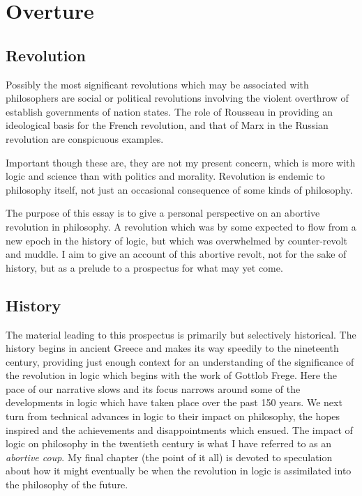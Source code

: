 \chapter{Overture}\label{Overture}

\section{Revolution}

Possibly the most significant revolutions which may be associated with philosophers are social or political revolutions involving the violent overthrow of establish governments of nation states.
The role of Rousseau in providing an ideological basis for the French revolution, and that of Marx in the Russian revolution are conspicuous examples.

Important though these are, they are not my present concern, which is more with logic and science than with politics and morality.
Revolution is endemic to philosophy itself, not just an occasional consequence of some kinds of philosophy.

The purpose of this essay is to give a personal perspective on an abortive revolution in philosophy.
A revolution which was by some expected to flow from a new epoch in the history of logic, but which was overwhelmed by counter-revolt and muddle.
I aim to give an account of this abortive revolt, not for the sake of history, but as a prelude to a prospectus for what may yet come.

\section{History}

The material leading to this prospectus is primarily but selectively historical.
The history begins in ancient Greece and makes its way speedily to the nineteenth century, providing just enough context for an understanding of the significance of the revolution in logic which begins with the work of Gottlob Frege.
Here the pace of our narrative slows and its focus narrows around some of the developments in logic which have taken place over the past 150 years.
We next turn from technical advances in logic to their impact on philosophy, the hopes inspired and the achievements and disappointments which ensued.
The impact of logic on philosophy in the twentieth century is what I have referred to as an {\it abortive coup}.
My final chapter (the point of it all) is devoted to speculation about how it might eventually be when the revolution in logic is assimilated into the philosophy of the future.

